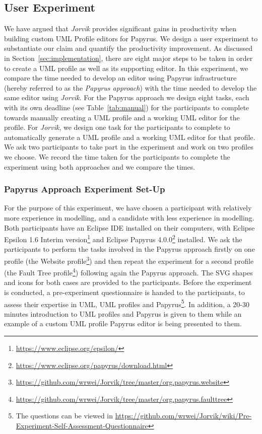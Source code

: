 \subsection{User Experiment}
We have argued that \textit{Jorvik} provides significant gains in productivity when building custom UML Profile editors for Papyrus.
We design a user experiment to substantiate our claim and quantify the productivity improvement. 
As discussed in Section~\ref{sec:implementation}, there are eight major steps to be taken in order to create a UML profile as well as its supporting editor. 
In this experiment, we compare the time needed to develop an editor using Papyrus infrastructure (hereby referred to as the \textit{Papyrus approach}) with the time needed to develop the same editor using \textit{Jorvik}.
For the Papyrus approach we design eight tasks, each with its own deadline (see Table~\ref{tab:manual}) for the participants to complete towards manually creating a UML profile and a working UML editor for the profile.
For \textit{Jorvik}, we design one task for the participants to complete to automatically generate a UML profile and a working UML editor for that profile.
We ask two participants to take part in the experiment and work on two profiles we choose. 
We record the time taken for the participants to complete the experiment using both approaches and we compare the times.

\subsubsection{Papyrus Approach Experiment Set-Up}
For the purpose of this experiment, we have chosen a participant with relatively more experience in modelling, and a candidate with less experience in modelling. 
Both participants have an Eclipse IDE installed on their computers, with Eclipse Epsilon 1.6 Interim version\footnote{\url{https://www.eclipse.org/epsilon/}} and Eclipse Papyrus 4.0.0\footnote{\url{https://www.eclipse.org/papyrus/download.html}} installed.
We ask the participants to perform the tasks involved in the Papyrus approach firstly on one profile (the Website profile\footnote{\url{https://github.com/wrwei/Jorvik/tree/master/org.papyrus.website}}) and then repeat the experiment for a second profile (the Fault Tree profile\footnote{\url{https://github.com/wrwei/Jorvik/tree/master/org.papyrus.faulttree}}) following again the Papyrus approach. 
The SVG shapes and icons for both cases are provided to the participants. 
Before the experiment is conducted, a pre-experiment questionnaire is handed to the participants, to assess their expertise in UML, UML profiles and Papyrus\footnote{The questions can be viewed in \url{https://github.com/wrwei/Jorvik/wiki/Pre-Experiment-Self-Assessment-Questionnaire}}. 
In addition, a 20-30 minutes introduction to UML profiles and Papyrus is given to them while an example of a custom UML profile Papyrus editor is being presented to them. 

